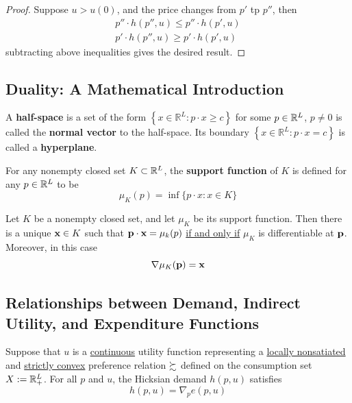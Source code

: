 \documentclass{report}
\begin{document}
 			\begin{proof}
 				Suppose $u > u(0)$, and the price changes from $p'$ tp $p''$, then
 				\begin{align}
 					p'' \cdot h(p'', u) \leq p'' \cdot h(p', u) \\
 					p' \cdot h(p'', u) \geq p' \cdot h(p', u)
 				\end{align}
 				subtracting above inequalities gives the desired result.
 			\end{proof}
 			
 		\subsection{Duality: A Mathematical Introduction}
 			\begin{definition}
 				A \textbf{half-space} is a set of the form $\left\{x \in \mathbb{R}^{L} : p \cdot x \geq c\right\}$ for some $p \in \mathbb{R}^L$, $p \neq 0$ is called the \textbf{normal vector} to the half-space. Its boundary $\left\{x \in \mathbb{R}^{L} : p \cdot x = c\right\}$ is called a \textbf{hyperplane}.
 			\end{definition}
 		
 			\begin{definition}[3.F.1]
 				For any nonempty closed set $K \subset \mathbb{R}^L$, the \textbf{support function} of $K$ is defined for any $p \in \mathbb{R}^L$ to be 
 				\begin{equation}
 					\mu_{K}(p)=\inf \{p \cdot x : x \in K\}
 				\end{equation}
 			\end{definition}
 				
 			\begin{proposition}
 				Let $K$ be a nonempty closed set, and let $\mu_K$ be its support function. Then there is a unique $\textbf{x} \in K$ such that $\textbf{p} \cdot \textbf{x} = \mu_k(p)$ \ul{if and only if} $\mu_K$ is differentiable at $\textbf{p}$. Moreover, in this case
 				\begin{equation}
 					\nabla \mu_K(\textbf{p}) = \textbf{x}
 				\end{equation}
 			\end{proposition}
 			
 		\subsection{Relationships between Demand, Indirect Utility, and Expenditure Functions}
 			\begin{proposition}
 				Suppose that $u$ is a \ul{continuous} utility function representing a \ul{locally nonsatiated} and \ul{strictly convex} preference relation $\succsim$ defined on the consumption set $X := \mathbb{R}^L_+$. For all $p$ and $u$, the Hicksian demand $h(p, u)$ satisfies
 				\begin{equation}
 					h(p, u)=\nabla_{p} e(p, u)
 				\end{equation}
 			\end{proposition}
 			
\end{document}
